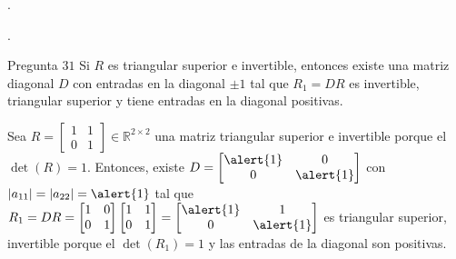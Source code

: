 \begin{frame}

	\begin{definition}[Rango]
		.
	\end{definition}

	\begin{definition}
		.
	\end{definition}

	\begin{alertblock}{Pregunta $31$}
		Si $R$ es triangular superior e invertible, entonces existe
		una matriz diagonal $D$ con entradas en la diagonal $\pm 1$ tal
		que $R_{1}=DR$ es invertible, triangular superior y tiene
		entradas en la diagonal positivas.
	\end{alertblock}

	\begin{example}[de la pregunta $31$]
		Sea
		\begin{math}
			R=
			\begin{bmatrix}
				1 & 1 \\
				0 & 1
			\end{bmatrix}\in\mathbb{R}^{2\times 2}
		\end{math}
		una matriz triangular superior e invertible porque el
		$\det\left(R\right)=1$.
		Entonces, existe
		\begin{math}
			D=
			\begin{bmatrix}
				\alert{1} & 0         \\
				0         & \alert{1}
			\end{bmatrix}
		\end{math}
		con
		\begin{math}
			\left|a_{11}\right|=
			\left|a_{22}\right|=
			\alert{1}
		\end{math}
		tal que
		\begin{math}
			R_{1}=
			DR=
			\begin{bmatrix}
				1 & 0 \\
				0 & 1
			\end{bmatrix}
			\begin{bmatrix}
				1 & 1 \\
				0 & 1
			\end{bmatrix}=
			\begin{bmatrix}
				\alert{1} & 1         \\
				0         & \alert{1}
			\end{bmatrix}
		\end{math}
		es triangular superior, invertible porque el
		$\det\left(R_{1}\right)=1$ y las entradas
		de la diagonal son \alert{positivas}.
	\end{example}
\end{frame}

